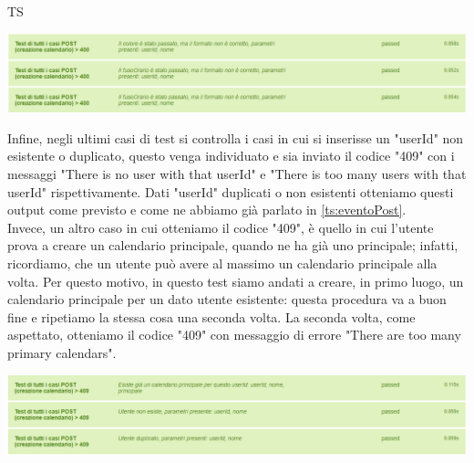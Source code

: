 \begin{listaPersonale}{TS}
                \begin{center}
                        \includegraphics[width=1\textwidth, height=0.13\textheight]{img/png/tests/CalendarioPost/400_wrongFormat_PostCalendario.png}
                \end{center}
                Infine, negli ultimi casi di test si controlla i casi in cui si inserisse un "userId" non esistente o duplicato, questo venga individuato e sia inviato il codice "409" con i messaggi "There is no user with that userId" e "There is too many users with that userId" rispettivamente. Dati "userId" duplicati o non esistenti otteniamo questi output come previsto e come ne abbiamo già parlato in \ref{ts:eventoPost}. \\
                Invece, un altro caso in cui otteniamo il codice "409", è quello in cui l'utente prova a creare un calendario principale, quando ne ha già uno principale; infatti, ricordiamo, che un utente può avere al massimo un calendario principale alla volta. Per questo motivo, in questo test siamo andati a creare, in primo luogo, un calendario principale per un dato utente esistente: questa procedura va a buon fine e ripetiamo la stessa cosa una seconda volta. La seconda volta, come aspettato, otteniamo il codice "409" con messaggio di errore "There are too many primary calendars".
                \begin{center}
                        \includegraphics[width=1\textwidth, height=0.12\textheight]{img/png/tests/CalendarioPost/409_postCalendario.png}

\end{center}
\end{listaPersonale}
